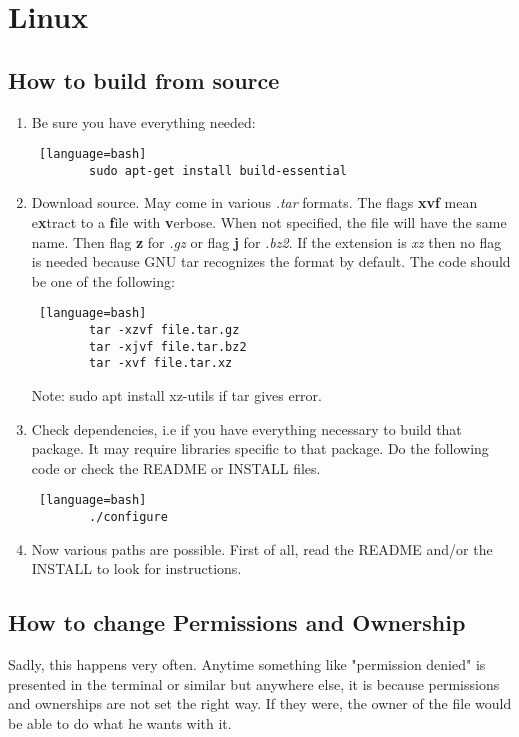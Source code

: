 


\section{Linux }




\subsection{How to build from source}
\begin{enumerate}
    \item Be sure you have everything needed: 
    \begin{lstlisting} [language=bash]
        sudo apt-get install build-essential
    \end{lstlisting}

    \item Download source. May come in various \textit{.tar} formats. The flags \textbf{xvf} mean e\textbf{x}tract to a \textbf{f}ile with \textbf{v}erbose. When not specified, the file will have the same name. Then flag \textbf{z} for \textit{.gz} or flag \textbf{j} for \textit{.bz2}. If the extension is \textit{xz} then no flag is needed because GNU tar recognizes the format by default. The code should be one of the following:
    \begin{lstlisting} [language=bash]
        tar -xzvf file.tar.gz
        tar -xjvf file.tar.bz2
        tar -xvf file.tar.xz
    \end{lstlisting}
    Note: sudo apt install xz-utils if tar gives error.
    
    \item Check dependencies, i.e if you have everything necessary to build that package. It may require libraries specific to that package. Do the following code or check the README or INSTALL files.
    \begin{lstlisting} [language=bash]
        ./configure
    \end{lstlisting}

    \item Now various paths are possible. First of all, read the README and/or the INSTALL to look for instructions. %
\end{enumerate}





\subsection{How to change Permissions and Ownership}
\par Sadly, this happens very often. Anytime something like "permission denied" is presented in the terminal or similar but anywhere else, it is because permissions and ownerships are not set the right way. If they were, the owner of the file would be able to do what he wants with it.

